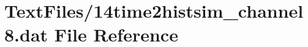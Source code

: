 \hypertarget{14time2histsim__channel8_8dat}{}\section{Text\+Files/14time2histsim\+\_\+channel8.dat File Reference}
\label{14time2histsim__channel8_8dat}
